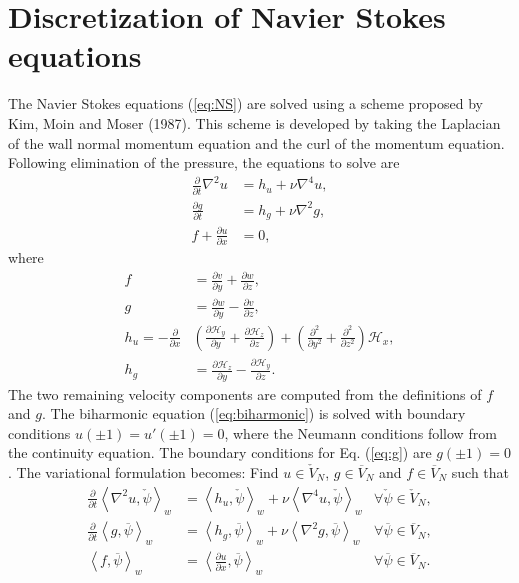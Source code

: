 \documentclass[11pt, oneside]{article}
\newcommand{\N}[1]{\check{#1}}
\newcommand{\D}[1]{\overline{#1}}
\begin{document}
\section{Discretization of Navier Stokes equations}
\label{sec:discretizationNS}
The Navier Stokes equations (\ref{eq:NS}) are solved using a scheme 
proposed by Kim, Moin and Moser (1987). This scheme is developed by taking the 
Laplacian of the wall normal momentum equation and the curl of the momentum 
equation. Following elimination of the pressure, the equations to solve are 
\begin{align}
\frac{\partial}{\partial t} \nabla^2 u &= h_u + \nu \nabla^4 u, 
\label{eq:biharmonic} \\
\frac{\partial g}{\partial t} &= h_g + \nu \nabla^2 g, \label{eq:g} \\
f + \frac{\partial u}{\partial x} &= 0, \label{eq:f}
\end{align}
where
\begin{align}
f &= \frac{\partial v}{\partial y} + \frac{\partial w}{\partial z}, \\
g &= \frac{\partial w}{\partial y} - \frac{\partial v}{\partial z}, \\
h_u = -\frac{\partial}{\partial x} &\left( \frac{\partial 
\mathcal{H}_y}{\partial y} + \frac{\partial \mathcal{H}_z}{\partial z} \right) 
+ \left(\frac{\partial^2}{\partial y^2} + \frac{\partial^2}{\partial z^2} 
\right) \mathcal{H}_x ,
\\
h_g &= \frac{\partial \mathcal{H}_z}{\partial y} - \frac{\partial 
\mathcal{H}_y}{\partial z}.
\end{align}
The two remaining velocity components are computed from the definitions of $f$ 
and $g$. The biharmonic equation (\ref{eq:biharmonic}) is solved with boundary 
conditions $u(\pm 1) = u'(\pm 1) = 0$, where the Neumann conditions follow 
from the continuity equation. The boundary conditions for Eq. (\ref{eq:g}) are 
$g(\pm 1) = 0$. The variational formulation becomes: Find ${u} \in 
\N{V}_N$, ${g} \in \D{V}_N$ and ${f} \in \D{V}_N$ such that
\begin{align}
	\frac{\partial }{\partial t} \left< \nabla^2 u, \N{\psi}\right>_w &= 
	\left<h_u, \N{\psi} \right>_w + \nu \left<\nabla^4u, \N{\psi}\right>_w 
	&\forall \N{\psi} \in \N{V}_N, \label{eq:u1} \\
	\frac{\partial}{\partial t}\left<g, \D{\psi}\right>_w &= \left<h_g, 
	\D{\psi}\right>_w + \nu 
	\left<\nabla^2 g, \D{\psi}\right>_w &\forall \D{\psi} \in \D{V}_N ,
	\label{eq:g1} \\
	\left<f, \D{\psi}\right>_w &= \left<\frac{\partial u}{\partial x}, 
	\D{\psi}\right>_w &\forall \D{\psi} \in \D{V}_N. \label{eq:f1}
\end{align}
\end{document}
